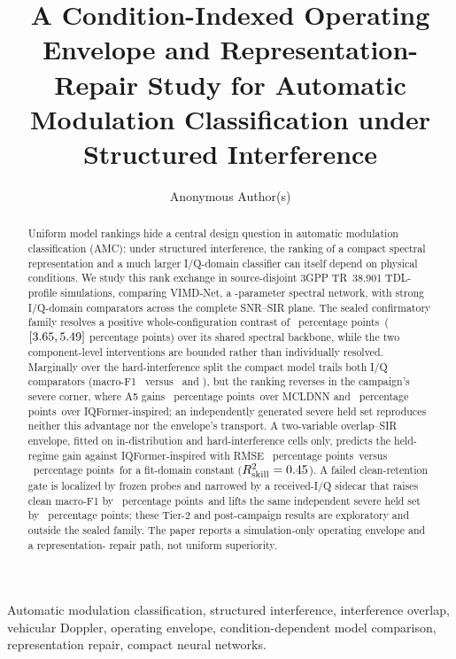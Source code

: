 \documentclass[letterpaper,journal]{IEEEtran}
\title{A Condition-Indexed Operating Envelope and Representation-Repair Study
for Automatic Modulation Classification under Structured Interference}
\author{Anonymous Author(s)}
\newcommand{\method}{VIMD-Net}
\newcommand{\pp}{percentage points}
\begin{document}
\maketitle

\begin{abstract}
Uniform model rankings hide a central design question in automatic modulation
classification (AMC): under structured interference, the ranking of a compact
spectral representation and a much larger I/Q-domain classifier can itself
depend on physical conditions. We study this rank exchange in source-disjoint
3GPP TR~38.901 TDL-profile simulations, comparing \method, a
\ParamsAFive-parameter spectral network, with strong I/Q-domain comparators
across the complete SNR--SIR plane. The sealed confirmatory family resolves a
positive whole-configuration contrast of \MethodEffectDiff\ \pp\
($[3.65,5.49]$ \pp) over its shared spectral
backbone, while the two component-level
interventions are bounded rather than individually resolved. Marginally over
the hard-interference split the compact model trails both I/Q comparators
(macro-F1 \AbsAFiveHard\ versus \AbsMCLDNNHard\ and \AbsIQFormerHard), but the
ranking reverses in the campaign's severe corner, where A5 gains
\SevereGainMcldnn\ \pp\ over MCLDNN and \SevereGainIqformer\ \pp\ over
IQFormer-inspired; an independently generated severe held set reproduces
neither this advantage nor the envelope's transport. A two-variable overlap--SIR envelope, fitted on
in-distribution and hard-interference cells only, predicts the held-regime
gain against IQFormer-inspired with RMSE \EnvelopeIqformerHoldoutRmse\ \pp\
versus \EnvelopeConstantRmseIQ\ \pp\ for a fit-domain constant
($R^2_{\mathrm{skill}}=0.45$). A failed clean-retention gate
is localized by frozen probes and narrowed by a received-I/Q sidecar that
raises clean macro-F1 by \SidecarCleanVsAFiveDiff\ \pp\ and lifts the same
independent severe held set by \SevereRepairDiff\ \pp; these Tier-2 and
post-campaign results are exploratory and outside the sealed family. The
paper reports a simulation-only operating envelope and a representation-
repair path, not uniform superiority.
\end{abstract}

\begin{IEEEkeywords}
Automatic modulation classification, structured interference, interference
overlap, vehicular Doppler, operating envelope, condition-dependent model
comparison, representation repair, compact neural networks.
\end{IEEEkeywords}
\end{document}
